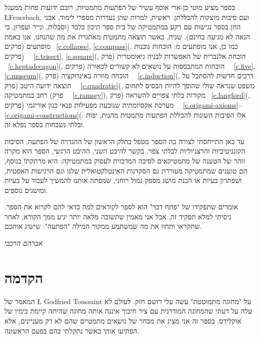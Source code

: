בספר מציע מוטי בן-ארי אוסף עשיר של הפתעות מתמטיות, רובם ידועות פחות ממעגל 
\L{Feuerbach},
ועם סיבות מוצקות להכללתן. ראשית, למרות שהן נעדרות מספרי לימוד, אבני החן בספר נגישות עם רקע במתמטיקה של בית ספר תיכון בלבד (וסבלות, ונייר ועפרון, כי הנאה לא מגיעה בחינם). שנית, כאשר תוצאה מתמטית מאתגרת את מה שהנחנו, אנו באמת מופתעים (פרקים~%
\ref{c.collapse}, \ref{c.compass}(.
כמו כן, אנו מופתעים מ: הוכחות נובנות (פרקים~%
~\ref{c.trisect}, \ref{c.square}(,
הוכחה אלגברית של האפשרות לבניה גיאומטרית (פרק~%
~\ref{c.heptadecagon}(,
הוכחות המתבססות על נושאים לא קשורים לכאורה (פרקים~%
~\ref{c.five}, \ref{c.museum}(,
הוכחה מוזרה באינדוקציה (פרק~%
~\ref{c.induction}(,
דרכים חדשות להסתכל על תוצאה ידועה היטב (פרק~%
~\ref{c.quadratic}(,
משפט שנראה שולי שהופך להיות הבסיס לתחום רחב במתמטיקה (פרק~%
~\ref{c.ramsey}),
מקורות בלתי צפויים להשראה (פרק~%
\ref{c.langford}(,
מערכת אקסיומתית שנובעת מפעילות פנאי כגון אוריגמי (פרקים~%
~\ref{c.origami-axioms}--\ref{c.origami-constructions}(.
אלו הסיבות השונות להכללת הפתעות מתמטית מהנות, יפות ובלתי נשכחות בספר נפלא זה.

עד כאן התייחסתי לצורה בה הספר מטפל בחלק הראשון של ההגדרה של הפתעה, הסיבות הקוגניטיביות והרצניוליות לבלתי צפוי. בקשר להיבט השני, ההיבט הרגשי, הספר הוא מקרה זוהר של הטענה של מתמטיקאים לסיבה המרכזית לעסוק במתמטיקה: היא מרתקת! בנוסף, הם טוענים שמתמטיקה מעוררת גם הסקרנות האינטלקטואלית שלנו וגם הרגישות האסטית, ושפתרון בעיות או הבנת מושג מספק גמול רוחני, שמפתה אותנו להמשיך לעבוד על בעיות ומושגים נוספים.

אומרים שתפקידו של "פתח דבר" הוא לספר לקוראים למה כדאי להם לקרוא את הספר. ניסיתי למלא תפקיד זה, אבל אני מאמין שתשובה מלאה יותר יגיע ממך הקורא, לאחר שתקראו ותחוו את מה שמשתמע ממקור המילה "הפתעה": שישיג אותכם.

\vspace{\baselineskip}
\begin{flushleft}
\textit{אברהם הרכבי}
\end{flushleft}


\thispagestyle{empty}


\chapter{הקדמה}


\setcounter{page}{1}

המאמר של 
\L{\cite{toussaint} Godfried Toussaint}
על "מחוגה מתמוטטת" עשה עלי רושם חזק. לעולם לא עלה על דעתי שהמחוגה המודרנית עם ציר חיכוך איננה אותה מחוגה שהיתה קיימת בימיו של אוקלידס. 
בספר זה אני מציג את מבחר של נושאים מתמטיים שהם לא רק מעניינים, אלא הפתיעו אותי כאשר נתקלתי בהם בפעם הראשונה. 

